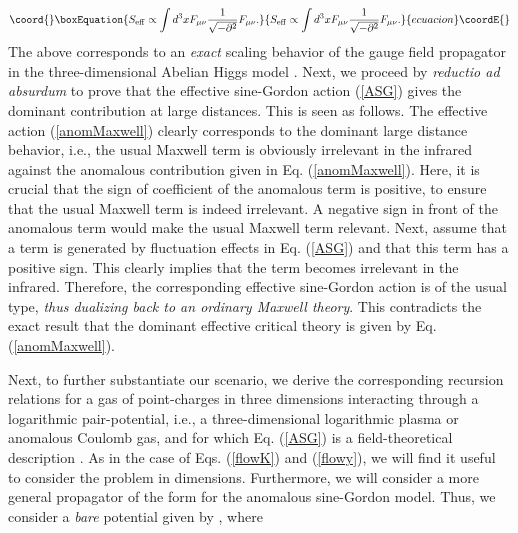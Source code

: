 \documentclass[a4paper,showpacs,preprintnumbers,amsmath,amssymb,prl,twocolumn]{revtex4}
\begin{document}
\begin{equation}\coord{}\boxEquation{
\label{anomMaxwell}
S_{\rm eff}\propto\int d^3xF_{\mu\nu}\frac{1}{\sqrt{
-\partial^2}}F_{\mu\nu}.
}{
S_{\rm eff}\propto\int d^3xF_{\mu\nu}\frac{1}{\sqrt{
-\partial^2}}F_{\mu\nu}.
}{ecuacion}\coordE{}\end{equation}
The above corresponds to an {\it exact} scaling 
behavior of the gauge field propagator in the three-dimensional 
Abelian Higgs model \cite{Herbut}. Next, we proceed by 
{\it reductio ad absurdum} to prove that the effective 
sine-Gordon action (\ref{ASG}) gives the dominant contribution 
at large distances. This is seen as follows.  
The effective action (\ref{anomMaxwell}) clearly corresponds 
to the dominant large distance behavior, i.e., the usual 
Maxwell term \coordHE{} is obviously irrelevant in the 
infrared against the anomalous contribution given in Eq. (\ref{anomMaxwell}). 
Here, it is crucial that the sign of coefficient of the anomalous term is
positive, to ensure that the usual Maxwell term is indeed irrelevant. 
A negative sign in front of the anomalous term would make the usual Maxwell 
term relevant. Next, assume that a  \coordHE{} 
term is generated by fluctuation effects in Eq. (\ref{ASG}) and that  
this term has a positive sign. This clearly implies that the                  
\coordHE{} term becomes irrelevant in the infrared. 
Therefore, the corresponding effective sine-Gordon action is of the usual 
type, {\it thus dualizing back to an ordinary Maxwell theory}. This contradicts 
the exact result that the dominant effective critical theory is given by 
Eq. (\ref{anomMaxwell}).  

Next, to further substantiate our scenario, we derive the corresponding 
recursion relations for a gas of point-charges in three dimensions
interacting through a logarithmic pair-potential, i.e., a three-dimensional
logarithmic plasma or anomalous Coulomb gas, and for which Eq. (\ref{ASG}) 
is a field-theoretical description \cite{KNS}. As in the case of Eqs. 
(\ref{flowK}) and (\ref{flowy}), we will find it useful to consider the problem 
in \coordHE{} dimensions. Furthermore, we will consider a more general propagator 
of the form \coordHE{} for the anomalous sine-Gordon model. Thus, we 
consider a {\it bare} potential given by \coordHE{}, where 
\end{document}
